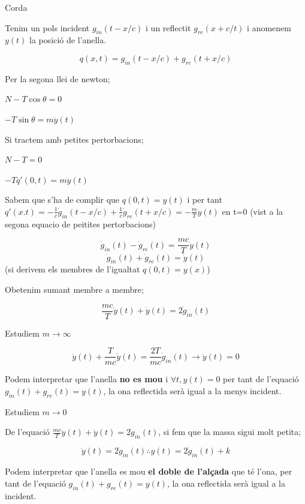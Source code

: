 \documentclass[12pt]{article}
\begin{document}
\begin{examplebox}{Corda}

    Tenim un pols incident $g_{in}(t-x/c)$ i un reflectit $g_{re}(x+c/t)$ i anomenem $y(t)$ la posició de l'anella.

    \[q(x,t) = g_{in}(t-x/c) + g_{re}(t+x/c)\]

    Per la segona llei de newton;

    $N - T\cos \theta = 0$

    $-T\sin \theta = m\ddot{y}(t)$

    Si tractem amb petites pertorbacions;

    $N-T = 0$

    $-Tq'(0,t) = m\ddot{y}(t)$

    Sabem que s'ha de complir que $q(0,t) = y(t)$ i per tant $q'(x.t) = -\frac{1}{c} \dot{g}_{in}(t-x/c) + \frac{1}{c}\dot{g}_{re}(t+x/c) = -\frac{m}{T} \ddot{y}(t)$ en t=0 (vist a la segona equacio de peitites pertorbacions)

    \[\dot{g}_{in}(t) - \dot{g}_{re}(t) = \frac{mc}{T} \ddot{y}(t)\]
    \[\dot{g}_{in}(t) + \dot{g}_{re}(t) = \dot{y}(t)\] (si derivem els membres de l'igualtat $q(0,t) = y(x)$)

    Obetenim sumant membre a membre;

    \[\boxed{\frac{mc}{T} \ddot{y}(t) + \dot{y}(t) = 2\dot{g}_{in}(t)}\] 

    \noindent {}

    Estudiem $m \rightarrow \infty$

    \[\ddot{y}(t)+ \frac{T}{mc}\dot{y}(t) = \frac{2T}{mc}\dot{g}_{in}(t) \rightarrow \ddot{y}(t) = 0\]

    Podem interpretar que l'anella \textbf{no es mou} i $\forall t, y(t)= 0$ per tant de l'equació $g_{in}(t) + g_{re}(t) = y(t)$, la ona reflectida serà igual a la menys incident.

    \noindent {}

    Estudiem $m \rightarrow 0$

    De l'equació $\frac{mc}{T}\ddot{y}(t) + \dot{y}(t) = 2\dot{g}_{in}(t)$, si fem que la massa sigui molt petita;

    \[\dot{y}(t) = 2\dot{g}_{in}(t) \therefore y(t) = 2\dot{g}_{in}(t) + k\]

    Podem interpretar que l'anella es mou \textbf{el doble de l'alçada} que té l'ona, per tant de l'equació $g_{in}(t) + g_{re}(t) = y(t)$, la ona reflectida serà igual a la incident.

\end{examplebox}
\end{document}
